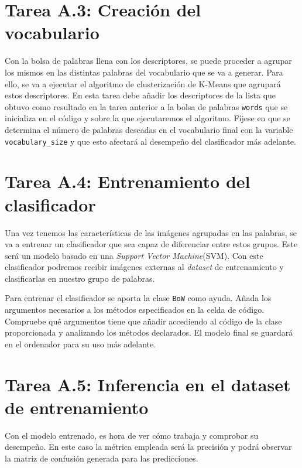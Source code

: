 \section*{Tarea A.3: Creación del vocabulario}

Con la bolsa de palabras llena con los descriptores, se puede proceder a agrupar los mismos en las distintas palabras del vocabulario que se va a generar. Para ello, se va a ejecutar el algoritmo de clusterización de K-Means que agrupará estos descriptores. En esta tarea debe añadir los descriptores de la lista que obtuvo como resultado en la tarea anterior a la bolsa de palabras \texttt{words} que se inicializa en el código y sobre la que ejecutaremos el algoritmo. Fíjese en que se determina el número de palabras deseadas en el vocabulario final con la variable \texttt{vocabulary\_size} y que esto afectará al desempeño del clasificador más adelante.

\section*{Tarea A.4: Entrenamiento del clasificador}

Una vez tenemos las características de las imágenes agrupadas en las palabras, se va a entrenar un clasificador que sea capaz de diferenciar entre estos grupos. Este será un modelo basado en una  \textit{Support Vector Machine}(SVM). Con este clasificador podremos recibir imágenes externas al \textit{dataset} de entrenamiento y clasificarlas en nuestro grupo de palabras.

Para entrenar el clasificador se aporta la clase \texttt{BoW} como ayuda. Añada los argumentos necesarios a los métodos especificados en la celda de código. Compruebe qué argumentos tiene que añadir accediendo al código de la clase proporcionada y analizando los métodos declarados. El modelo final se guardará en el ordenador para su uso más adelante.

\section*{Tarea A.5: Inferencia en el dataset de entrenamiento}

Con el modelo entrenado, es hora de ver cómo trabaja y comprobar su desempeño. En este caso la métrica empleada será la precisión y podrá observar la matriz de confusión generada para las predicciones.

